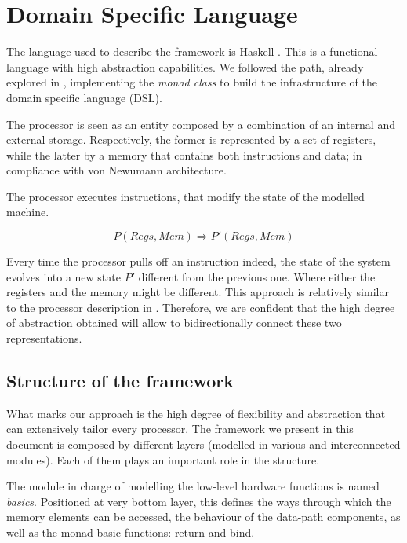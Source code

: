 \documentclass[conference]{IEEEtran}
\begin{document}

\section{Domain Specific Language}
\label{sec:dsl}
The language used to describe the framework is Haskell \cite{haskell}. This is a 
functional language with high abstraction capabilities.
We followed the path, already explored in \cite{armv7}, implementing the \textit{monad class}
to build the infrastructure of the domain specific language (DSL).

The processor is seen as an entity composed by a combination of an internal and
external storage. Respectively, the former is represented by a set of registers,
while the latter by a memory that contains both instructions and data; in compliance with von
Newumann architecture. 

The processor executes instructions, that modify the state of the modelled machine.

$$P(Regs, Mem) \Rightarrow P'(Regs, Mem)$$

\noindent Every time the processor pulls off an instruction indeed, the state of the system
evolves into a new state $P'$ different from the previous one. Where either the registers and
the memory might be different. This approach is relatively similar to the processor
description in \cite{isaFunc}. Therefore, we are confident that the high degree of
abstraction obtained will allow to bidirectionally connect these two representations.

\subsection{Structure of the framework}
\label{sec:struct}
What marks our approach is the high degree of flexibility and abstraction that can
extensively tailor every processor. The framework we present in this document is composed
by different layers (modelled in various and interconnected modules). Each of them plays 
an important role in the structure.

The module in charge of modelling the low-level hardware functions is named
\textit{basics}. Positioned at very bottom layer, this defines the ways through which the
memory elements can be accessed, the behaviour of the data-path components, 
as well as the monad basic functions: return and bind.
\end{document}
